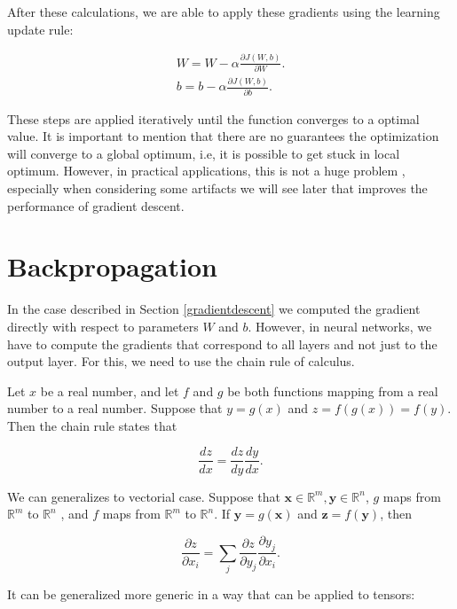 After these calculations, we are able to apply these gradients using the learning update rule:


\begin{align}
W = W - \alpha\frac{\partial{J(W,b)}}{\partial{W}}.\\
b = b - \alpha\frac{\partial{J(W,b)}}{\partial{b}}.
\end{align}

These steps are applied iteratively until the function converges to a optimal value. It is important to mention that there are no guarantees the optimization will converge to a global optimum, i.e, it is possible to get stuck in local optimum. However, in practical applications, this is not a huge problem  \cite{DBLP:journals/corr/GoodfellowV14}, especially when considering some artifacts we will see later that improves the performance of gradient descent.

\section{Backpropagation}
In the case described in Section \ref{gradientdescent} we computed the gradient directly with respect to parameters $W$ and $b$. However, in neural networks, we have to compute the gradients that correspond to all layers and not just to the output layer. For this, we need to use the chain rule of calculus.

Let $x$ be a real number, and let $f$ and $g$ be both functions mapping from a real
number to a real number. Suppose that $y = g(x)$ and $z = f (g(x)) = f (y)$. Then
the chain rule states that


\begin{equation}
\frac{dz}{dx} = \frac{dz}{dy}\frac{dy}{dx}.
\end{equation}

We can generalizes to vectorial case. Suppose that $\boldsymbol{x} \in \mathbb{R}^{m} , \boldsymbol{y} \in \mathbb{R}^{n}$, $g$ maps from $\mathbb{R}^{m}$ to $\mathbb{R}^{n}$ , and $f$ maps from $\mathbb{R}^{m}$ to $\mathbb{R}^{n}$. If $\boldsymbol{y} = g(\boldsymbol{x})$ and $\boldsymbol{z} = f( \boldsymbol{y})$, then

\begin{equation}
\frac{\partial{z}}{\partial{x_i}} = \sum_{j} \frac{\partial{z}}{\partial{y_{j}}}\frac{\partial{y_{j}}}{\partial{x_{i}}}.
\end{equation}
 
It can be generalized more generic in a way that can be applied to tensors:

